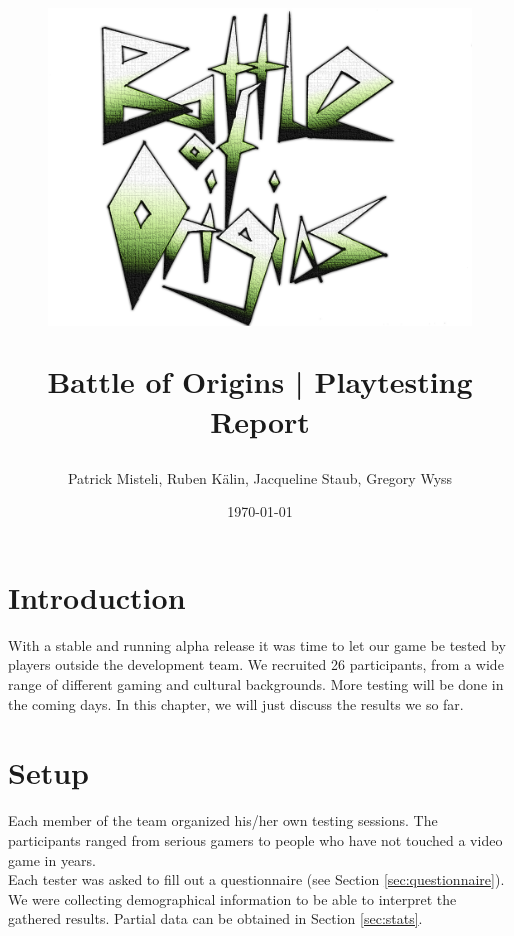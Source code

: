 \documentclass[11pt,a4paper,titlepage,table]{article}
\title{\blue  
	\begin{figure}[h!]
  		\centering
    	\includegraphics[width=1\textwidth]{img/logo3}
	\end{figure}
	\blueb Battle of Origins | Playtesting Report}
\author{Patrick Misteli, Ruben Kälin, Jacqueline Staub, Gregory Wyss}
\date{\today}
\begin{document}
	\hypersetup{linkcolor=MyColor1}	
	
\maketitle


\section{Introduction}

With a stable and running alpha release it was time to let our game be tested by players outside the development team. We recruited 26 participants, from a wide range of different gaming and cultural backgrounds. More testing will be done in the coming days. In this chapter, we will just discuss the results we so far. 

\section{Setup} %
Each member of the team organized his/her own testing sessions. The participants ranged from serious gamers to people who have not touched a video game in years. \\

Each tester was asked to fill out a questionnaire (see Section \ref{sec:questionnaire}). We were collecting demographical information to be able to interpret the gathered results. Partial data can be obtained in Section \ref{sec:stats}. 
\end{document}
